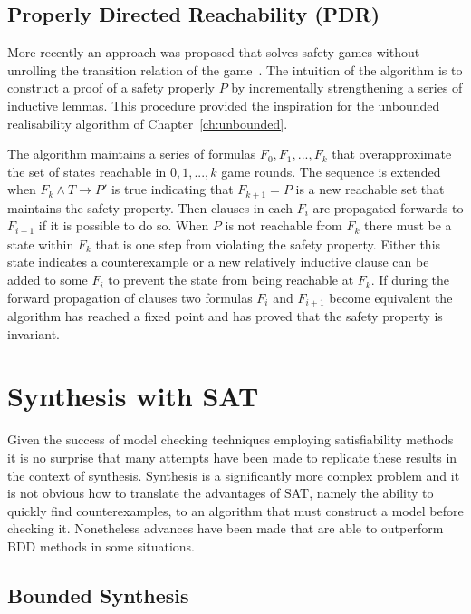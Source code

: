\subsection{Properly Directed Reachability (PDR)}
\label{sec:pdr}

More recently an approach was proposed that solves safety games without unrolling the transition relation of the game~\cite{Bradley11}. The intuition of the algorithm is to construct a proof of a safety properly $P$ by incrementally strengthening a series of inductive lemmas. This procedure provided the inspiration for the unbounded realisability algorithm of Chapter~\ref{ch:unbounded}.

The algorithm maintains a series of formulas $F_0, F_1, ..., F_k$ that overapproximate the set of states reachable in $0, 1, ..., k$ game rounds. The sequence is extended when $F_k \land T \to P'$ is true indicating that $F_{k+1} = P$ is a new reachable set that maintains the safety property. Then clauses in each $F_i$ are propagated forwards to $F_{i+1}$ if it is possible to do so. When $P$ is not reachable from $F_k$ there must be a state within $F_k$ that is one step from violating the safety property. Either this state indicates a counterexample or a new relatively inductive clause can be added to some $F_i$ to prevent the state from being reachable at $F_k$. If during the forward propagation of clauses two formulas $F_i$ and $F_{i+1}$ become equivalent the algorithm has reached a fixed point and has proved that the safety property is invariant.

\section{Synthesis with SAT}

Given the success of model checking techniques employing satisfiability methods it is no surprise that many attempts have been made to replicate these results in the context of synthesis. Synthesis is a significantly more complex problem and it is not obvious how to translate the advantages of SAT, namely the ability to quickly find counterexamples, to an algorithm that must construct a model before checking it. Nonetheless advances have been made that are able to outperform BDD methods in some situations.

\subsection{Bounded Synthesis}

